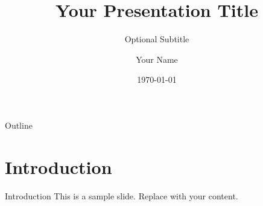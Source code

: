 \documentclass[10pt]{beamer}
\title{Your Presentation Title}
\subtitle{Optional Subtitle}
\author{Your Name}
\institute{Your Institute}
\date{\today}
\begin{document}
\frame{\titlepage}

\begin{frame}{Outline}
  \tableofcontents
\end{frame}

\section{Introduction}
\begin{frame}{Introduction}
  This is a sample slide. Replace with your content.
\end{frame}
\end{document}
